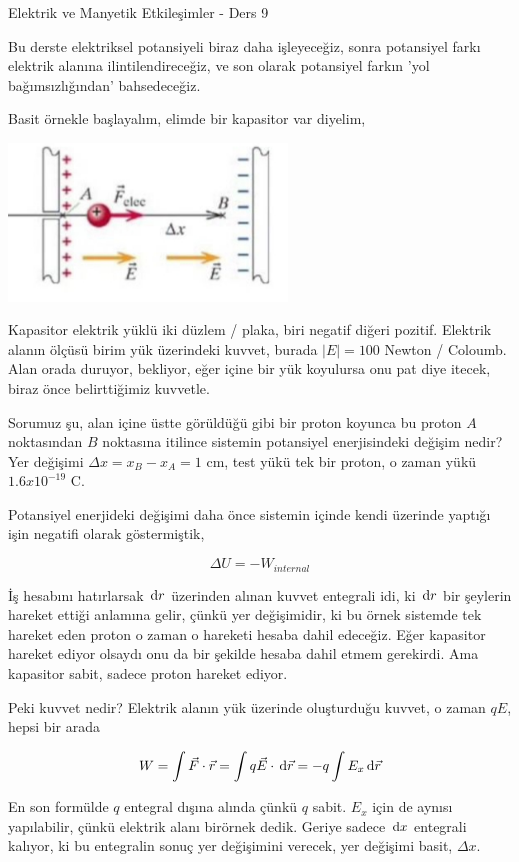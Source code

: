 \documentclass[12pt,fleqn]{article}\usepackage{../../common}
\begin{document}
Elektrik ve Manyetik Etkileşimler - Ders 9

Bu derste elektriksel potansiyeli biraz daha işleyeceğiz, sonra potansiyel farkı
elektrik alanına ilintilendireceğiz, ve son olarak potansiyel farkın 'yol
bağımsızlığından' bahsedeceğiz.

Basit örnekle başlayalım, elimde bir kapasitor var diyelim,

\includegraphics[width=20em]{09_01.jpg}

Kapasitor elektrik yüklü iki düzlem / plaka, biri negatif diğeri
pozitif. Elektrik alanın ölçüsü birim yük üzerindeki kuvvet, burada $|E|= 100$
Newton / Coloumb. Alan orada duruyor, bekliyor, eğer içine bir yük koyulursa onu
pat diye itecek, biraz önce belirttiğimiz kuvvetle.

Sorumuz şu, alan içine üstte görüldüğü gibi bir proton koyunca bu proton $A$
noktasından $B$ noktasına itilince sistemin potansiyel enerjisindeki değişim
nedir? Yer değişimi $\Delta x = x_B - x_A = 1$ cm, test yükü tek bir proton, o
zaman yükü $1.6 x 10^{-19}$ C.

Potansiyel enerjideki değişimi daha önce sistemin içinde kendi üzerinde yaptığı
işin negatifi olarak göstermiştik,

$$
\Delta U = -W_{internal}
$$

İş hesabını hatırlarsak $\,\mathrm{d} r$ üzerinden alınan kuvvet entegrali idi, ki $\,\mathrm{d}
r$ bir şeylerin hareket ettiği anlamına gelir, çünkü yer değişimidir, ki bu
örnek sistemde tek hareket eden proton o zaman o hareketi hesaba dahil
edeceğiz. Eğer kapasitor hareket ediyor olsaydı onu da bir şekilde hesaba dahil
etmem gerekirdi. Ama kapasitor sabit, sadece proton hareket ediyor.

Peki kuvvet nedir? Elektrik alanın yük üzerinde oluşturduğu kuvvet, o zaman $q
E$, hepsi bir arada

$$
W =
\int \vec{F} \cdot \vec{r} =
\int q \vec{E} \cdot \,\mathrm{d} \vec{r} = -q \int E_x \,\mathrm{d} \vec{r}
$$

En son formülde $q$ entegral dışına alında çünkü $q$ sabit. $E_x$ için de aynısı
yapılabilir, çünkü elektrik alanı birörnek dedik. Geriye sadece $\,\mathrm{d} x$
entegrali kalıyor, ki bu entegralin sonuç yer değişimini verecek, yer değişimi
basit, $\Delta x$.
\end{document}
